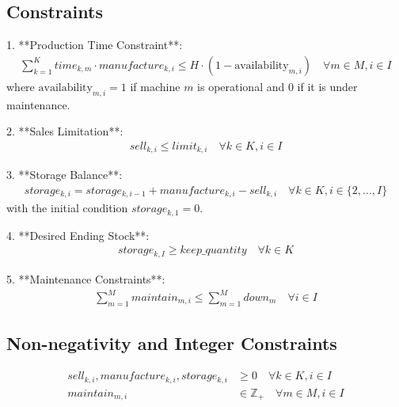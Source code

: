\documentclass{article}
\begin{document}
\subsection*{Constraints}
1. **Production Time Constraint**:
\begin{align*}
\sum_{k=1}^{K} time_{k,m} \cdot manufacture_{k,i} \leq H \cdot (1 - \text{availability}_{m,i}) \quad \forall m \in M, i \in I
\end{align*}
where \( \text{availability}_{m,i} = 1 \) if machine \( m \) is operational and \( 0 \) if it is under maintenance.

2. **Sales Limitation**:
\begin{align*}
sell_{k,i} \leq limit_{k,i} \quad \forall k \in K, i \in I
\end{align*}

3. **Storage Balance**:
\begin{align*}
storage_{k,i} = storage_{k,i-1} + manufacture_{k,i} - sell_{k,i} \quad \forall k \in K, i \in \{2,...,I\}
\end{align*}
with the initial condition \( storage_{k,1} = 0 \).

4. **Desired Ending Stock**:
\begin{align*}
storage_{k,I} \geq keep\_quantity \quad \forall k \in K
\end{align*}

5. **Maintenance Constraints**:
\begin{align*}
\sum_{m=1}^{M} maintain_{m,i} \leq \sum_{m=1}^{M} down_m \quad \forall i \in I
\end{align*}

\subsection*{Non-negativity and Integer Constraints}
\begin{align*}
sell_{k,i}, manufacture_{k,i}, storage_{k,i} & \geq 0 \quad \forall k \in K, i \in I \\
maintain_{m,i} & \in \mathbb{Z}_{+} \quad \forall m \in M, i \in I
\end{align*}
\end{document}

